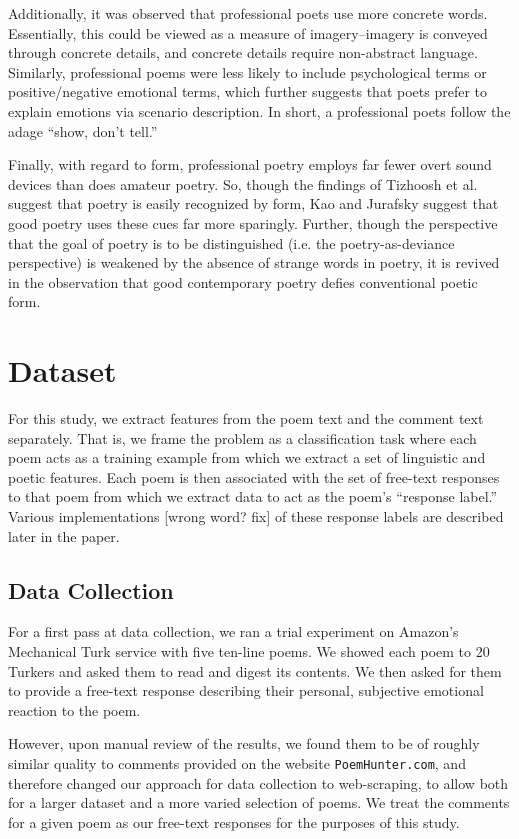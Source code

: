 \documentclass[11pt]{article}
\begin{document}
Additionally, it was observed that professional poets use more concrete words. Essentially, this could be viewed as a measure of imagery--imagery is conveyed through concrete details, and concrete details require non-abstract language. Similarly, professional poems were less likely to include psychological terms or positive/negative emotional terms, which further suggests that poets prefer to explain emotions via scenario description. In short, a professional poets follow the adage ``show, don’t tell.''

Finally, with regard to form, professional poetry employs far fewer overt sound devices than does amateur poetry. So, though the findings of Tizhoosh et al. suggest that poetry is easily recognized by form, Kao and Jurafsky suggest that good poetry uses these cues far more sparingly. Further, though the perspective that the goal of poetry is to be distinguished (i.e. the poetry-as-deviance perspective) is weakened by the absence of strange words in poetry, it is revived in the observation that good contemporary poetry defies conventional poetic form.

\section{Dataset}
For this study, we extract features from the poem text and the comment text separately. That is, we frame the problem as a classification task where each poem acts as a training example from which we extract a set of linguistic and poetic features. Each poem is then associated with the set of free-text responses to that poem from which we extract data to act as the poem's ``response label.'' Various implementations [wrong word? fix] of these response labels are described later in the paper.

\subsection*{Data Collection}
For a first pass at data collection, we ran a trial experiment on Amazon's Mechanical Turk service with five ten-line poems. We showed each poem to 20 Turkers and asked them to read and digest its contents. We then asked for them to provide a free-text response describing their personal, subjective emotional reaction to the poem. 

However, upon manual review of the results, we found them to be of roughly similar quality to comments provided on the website \texttt{PoemHunter.com}, and therefore changed our approach for data collection to web-scraping, to allow both for a larger dataset and a more varied selection of poems. We treat the comments for a given poem as our free-text responses for the purposes of this study.
\end{document}
